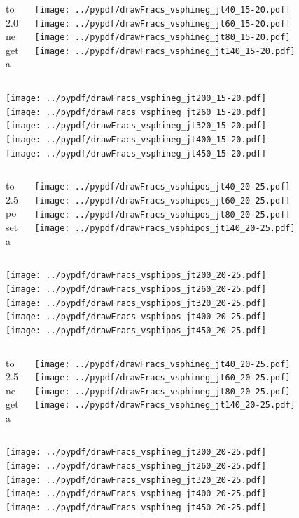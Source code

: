 \documentclass[aspectratio=169]{beamer}
\begin{document}
\begin{figure}[p]
\flushleft
\begin{columns}[T]
\begin{column}{.2\linewidth}
 to 2.0 negeta
\end{column}
\begin{column}{.8\linewidth}
\texttt{[image: ../pypdf/drawFracs\_vsphineg\_jt40\_15-20.pdf]}
\texttt{[image: ../pypdf/drawFracs\_vsphineg\_jt60\_15-20.pdf]}
\texttt{[image: ../pypdf/drawFracs\_vsphineg\_jt80\_15-20.pdf]}
\texttt{[image: ../pypdf/drawFracs\_vsphineg\_jt140\_15-20.pdf]}
\end{column}
\end{columns}
\texttt{[image: ../pypdf/drawFracs\_vsphineg\_jt200\_15-20.pdf]}
\texttt{[image: ../pypdf/drawFracs\_vsphineg\_jt260\_15-20.pdf]}
\texttt{[image: ../pypdf/drawFracs\_vsphineg\_jt320\_15-20.pdf]}
\texttt{[image: ../pypdf/drawFracs\_vsphineg\_jt400\_15-20.pdf]}
\texttt{[image: ../pypdf/drawFracs\_vsphineg\_jt450\_15-20.pdf]}
\end{figure}

\begin{figure}[p]
\flushleft
\begin{columns}[T]
\begin{column}{.2\linewidth}
 to 2.5 poseta
\end{column}
\begin{column}{.8\linewidth}
\texttt{[image: ../pypdf/drawFracs\_vsphipos\_jt40\_20-25.pdf]}
\texttt{[image: ../pypdf/drawFracs\_vsphipos\_jt60\_20-25.pdf]}
\texttt{[image: ../pypdf/drawFracs\_vsphipos\_jt80\_20-25.pdf]}
\texttt{[image: ../pypdf/drawFracs\_vsphipos\_jt140\_20-25.pdf]}
\end{column}
\end{columns}
\texttt{[image: ../pypdf/drawFracs\_vsphipos\_jt200\_20-25.pdf]}
\texttt{[image: ../pypdf/drawFracs\_vsphipos\_jt260\_20-25.pdf]}
\texttt{[image: ../pypdf/drawFracs\_vsphipos\_jt320\_20-25.pdf]}
\texttt{[image: ../pypdf/drawFracs\_vsphipos\_jt400\_20-25.pdf]}
\texttt{[image: ../pypdf/drawFracs\_vsphipos\_jt450\_20-25.pdf]}
\end{figure}

\begin{figure}[p]
\flushleft
\begin{columns}[T]
\begin{column}{.2\linewidth}
 to 2.5 negeta
\end{column}
\begin{column}{.8\linewidth}
\texttt{[image: ../pypdf/drawFracs\_vsphineg\_jt40\_20-25.pdf]}
\texttt{[image: ../pypdf/drawFracs\_vsphineg\_jt60\_20-25.pdf]}
\texttt{[image: ../pypdf/drawFracs\_vsphineg\_jt80\_20-25.pdf]}
\texttt{[image: ../pypdf/drawFracs\_vsphineg\_jt140\_20-25.pdf]}
\end{column}
\end{columns}
\texttt{[image: ../pypdf/drawFracs\_vsphineg\_jt200\_20-25.pdf]}
\texttt{[image: ../pypdf/drawFracs\_vsphineg\_jt260\_20-25.pdf]}
\texttt{[image: ../pypdf/drawFracs\_vsphineg\_jt320\_20-25.pdf]}
\texttt{[image: ../pypdf/drawFracs\_vsphineg\_jt400\_20-25.pdf]}
\texttt{[image: ../pypdf/drawFracs\_vsphineg\_jt450\_20-25.pdf]}
\end{figure}
\end{document}
